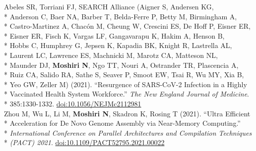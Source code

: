 \documentclass[margin,line]{res}
\begin{document}
\begin{resume}
\hspace*{9mm} Abeles SR, Torriani FJ, SEARCH Alliance (Aigner S, Andersen KG,\\*
\hspace*{9mm} Anderson C, Baer NA, Barber T, Belda-Ferre P, Betty M, Birmingham A,\\*
\hspace*{9mm} Castro-Martinez A, Chac\'on M, Cheung W, Crescini ES, De Hoff P, Eisner ER,\\*
\hspace*{9mm} Eisner ER, Fisch K, Vargas LF, Gangavarapu K, Hakim A, Henson B,\\*
\hspace*{9mm} Hobbs C, Humphrey G, Jepsen K, Kapadia BK, Knight R, Lastrella AL,\\*
\hspace*{9mm} Laurent LC, Lawrence ES, Machnicki M, Marotz CA, Matteson NL,\\*
\hspace*{9mm} Maunder DJ, \textbf{Moshiri N}, Ngo TT, Nouri A, Ostrander TR, Plascencia A,\\*
\hspace*{9mm} Ruiz CA, Salido RA, Sathe S, Seaver P, Smoot EW, Tsai R, Wu MY, Xia B,\\*
\hspace*{9mm} Yeo GW, Zeller M) (2021). ``Resurgence of SARS-CoV-2 Infection in a Highly\\*
\hspace*{9mm} Vaccinated Health System Workforce.'' \textit{The New England Journal of Medicine}.\\*\vspace{2mm}
\hspace*{8mm} 385:1330-1332. \href{https://doi.org/10.1056/NEJMc2112981}{doi:10.1056/NEJMc2112981}\\
\hspace*{4mm} Zhou M, Wu L, Li M, \textbf{Moshiri N}, Skadron K, Rosing T (2021). ``Ultra Efficient\\*
\hspace*{9mm} Acceleration for De Novo Genome Assembly via Near-Memory Computing.''\\*
\hspace*{9mm} \textit{International Conference on Parallel Architectures and Compilation Techniques}\\*\vspace{2mm}
\hspace*{8mm} \textit{(PACT) 2021}. \href{https://doi.org/10.1109/PACT52795.2021.00022}{doi:10.1109/PACT52795.2021.00022}\\

\end{resume}
\end{document}
